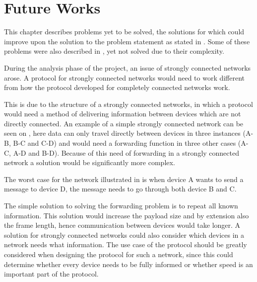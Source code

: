 \chapter{Future Works}\label{futureWorks}
This chapter describes problems yet to be solved, the solutions for which could improve upon the solution to the problem statement as stated in . 
Some of these problems were also described in , yet not solved due to their complexity.

During the analysis phase of the project, an issue of strongly connected networks arose.
A protocol for strongly connected networks would need to work different from how the protocol developed for completely connected networks work.

This is due to the structure of a strongly connected networks, in which a protocol would need a method of delivering information between devices which are not directly connected.
An example of a simple strongly connected network can be seen on , here data can only travel directly between devices in three instances  (A-B, B-C and C-D) and would need a forwarding function in three other cases (A-C, A-D and B-D). 
Because of this need of forwarding in a strongly connected network a solution would be significantly more complex.

\noindent
The worst case for the network illustrated in  is when device A wants to send a message to device D, the message needs to go through both device B and C.

The simple solution to solving the forwarding problem is to repeat all known information.
This solution would increase the payload size and by extension also the frame length, hence communication between devices would take longer.
A solution for strongly connected networks could also consider which devices in a network needs what information.
The use case of the protocol should be greatly considered when designing the protocol for such a network, since this could determine whether every device needs to be fully informed or whether speed is an important part of the protocol.

